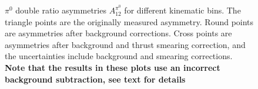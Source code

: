 \begin{figure}[H]
  \caption{$\pi^0$ double ratio asymmetries $A^{\pi^0}_{12}$ for different kinematic bins. The triangle points are the originally measured asymmetry. Round points are asymmetries after background corrections. Cross points are asymmetries after background and thrust smearing correction, and the uncertainties include background and smearing corrections. {\bf Note that the results in these plots use an incorrect background subtraction, see text for details}}
  \label{fig:pi0result}
\end{figure}

\begin{figure}[H]
  \centering     

\end{figure}
